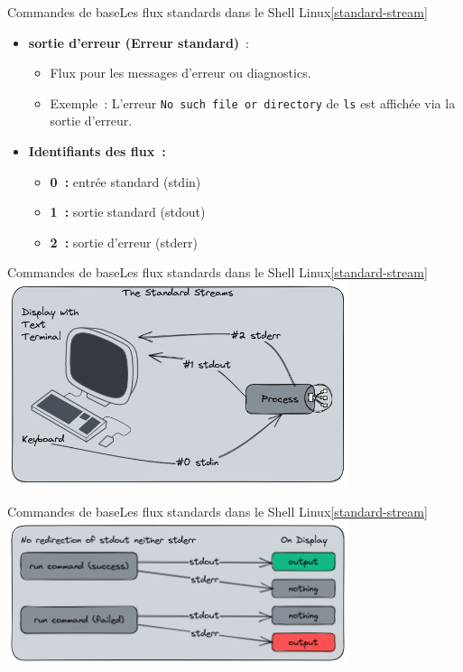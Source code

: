 \documentclass{beamer}
\begin{document}
    \begin{frame}{Commandes de base}{Les flux standards dans le Shell Linux\cref{standard-stream}}
        \begin{itemize}
            \item \textbf{sortie d'erreur (Erreur standard)}~:
            \begin{itemize}
                \item Flux pour les messages d'erreur ou diagnostics.
                \item Exemple~: L'erreur \lstinline{No such file or directory} de \lstinline{ls} est affichée via la sortie d'erreur.
            \end{itemize}
            \item \textbf{Identifiants des flux~:}
            \begin{itemize}
                \item \textbf{0~:} entrée standard (stdin)
                \item \textbf{1~:} sortie standard (stdout)
                \item \textbf{2~:} sortie d'erreur (stderr)
            \end{itemize}
        \end{itemize}
    \end{frame}

    \begin{frame}{Commandes de base}{Les flux standards dans le Shell Linux\cref{standard-stream}}
        \centering
        \includegraphics[width=10cm]{image/standard-stream-computer}
    \end{frame}

    \begin{frame}{Commandes de base}{Les flux standards dans le Shell Linux\cref{standard-stream}}
        \centering
        \includegraphics[width=10cm]{image/shell-stream-no-redirect}
    \end{frame}
\end{document}
